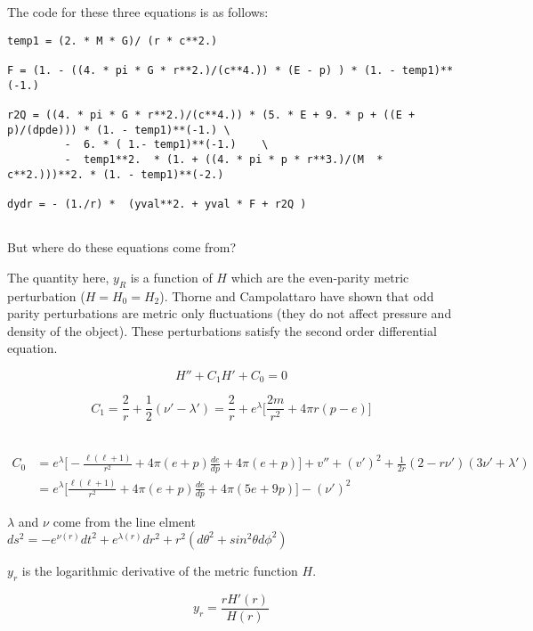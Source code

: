 \documentclass[11pt]{article}
\numberwithin{equation}{section}
\begin{document}
The code for these three equations is as follows:

\begin{lstlisting}
temp1 = (2. * M * G)/ (r * c**2.)

F = (1. - ((4. * pi * G * r**2.)/(c**4.)) * (E - p) ) * (1. - temp1)**(-1.)

r2Q = ((4. * pi * G * r**2.)/(c**4.)) * (5. * E + 9. * p + ((E + p)/(dpde))) * (1. - temp1)**(-1.) \
         -  6. * ( 1.- temp1)**(-1.)    \
         -  temp1**2.  * (1. + ((4. * pi * p * r**3.)/(M  * c**2.)))**2. * (1. - temp1)**(-2.)

dydr = - (1./r) *  (yval**2. + yval * F + r2Q ) 


\end{lstlisting}

But where do these equations come from?

The quantity here, $y_R$ is a function of $H$ which are the even-parity metric perturbation ($H=H_0=H_2$). Thorne and Campolattaro have shown that odd parity perturbations are metric only fluctuations (they do not affect pressure and density of the object). These perturbations satisfy the second order differential equation.

\begin{equation}
H'' + C_{1} H' + C_{0} = 0
\end{equation}

\begin{equation}
C_1 = \frac{2}{r} + \frac{1}{2} (\nu' -\lambda') = \frac{2}{r} + e^{\lambda} \bigg[ \frac{2m}{r^2} + 4 \pi r (p - e) \bigg]
\end{equation}\

\begin{align}
C_0 & = e^{\lambda} \bigg[ - \frac{\ell (\ell+ 1)}{r^2} + 4 \pi (e + p) \frac{de}{dp} + 4 \pi (e + p)    \bigg] + v'' + (v')^2 + \frac{1}{2 r} (2-r \nu ')(3 \nu' + \lambda') \\
	& = e^{\lambda}  \bigg[ \frac{\ell (\ell+ 1)}{r^2} + 4 \pi (e + p) \frac{de}{dp}  + 4 \pi (5e + 9p)  \bigg]  - (\nu')^{2} \nonumber 
\end{align}

$\lambda$ and $\nu$ come from the line elment $ds^2 = -e^{\nu(r)} dt^2 + e^{\lambda (r)} dr^2 + r^2 (d \theta^{2} + sin^{2} \theta d \phi^{2})$

$y_{r}$ is the logarithmic derivative of the metric function $H$.

\begin{equation}
y_r = \frac{r H'(r)}{H(r)}
\end{equation}
\end{document}
